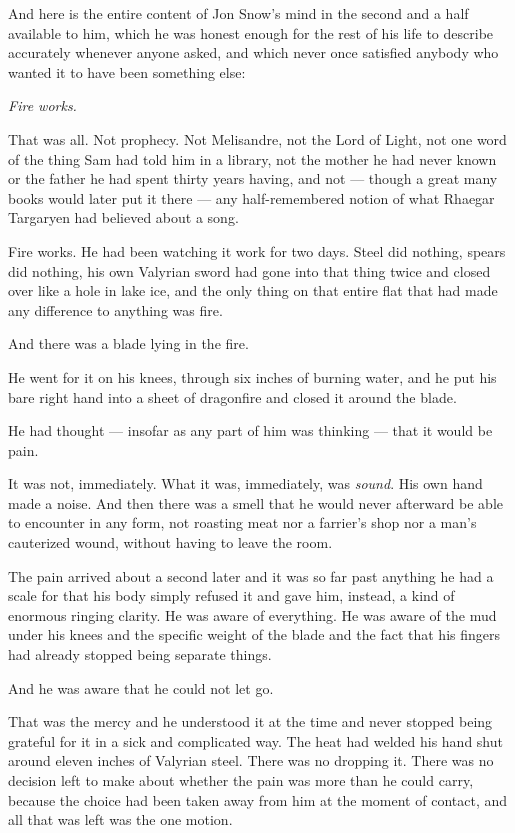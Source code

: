 And here is the entire content of Jon Snow’s mind in the second and a half available to him, which he was honest enough for the rest of his life to describe accurately whenever anyone asked, and which never once satisfied anybody who wanted it to have been something else:

\textit{Fire works.}

That was all. Not prophecy. Not Melisandre, not the Lord of Light, not one word of the thing Sam had told him in a library, not the mother he had never known or the father he had spent thirty years having, and not — though a great many books would later put it there — any half-remembered notion of what Rhaegar Targaryen had believed about a song.

Fire works. He had been watching it work for two days. Steel did nothing, spears did nothing, his own Valyrian sword had gone into that thing twice and closed over like a hole in lake ice, and the only thing on that entire flat that had made any difference to anything was fire.

And there was a blade lying in the fire.

He went for it on his knees, through six inches of burning water, and he put his bare right hand into a sheet of dragonfire and closed it around the blade.

\sceneBreak

He had thought — insofar as any part of him was thinking — that it would be pain.

It was not, immediately. What it was, immediately, was \textit{sound}. His own hand made a noise. And then there was a smell that he would never afterward be able to encounter in any form, not roasting meat nor a farrier’s shop nor a man’s cauterized wound, without having to leave the room.

The pain arrived about a second later and it was so far past anything he had a scale for that his body simply refused it and gave him, instead, a kind of enormous ringing clarity. He was aware of everything. He was aware of the mud under his knees and the specific weight of the blade and the fact that his fingers had already stopped being separate things.

And he was aware that he could not let go.

That was the mercy and he understood it at the time and never stopped being grateful for it in a sick and complicated way. The heat had welded his hand shut around eleven inches of Valyrian steel. There was no dropping it. There was no decision left to make about whether the pain was more than he could carry, because the choice had been taken away from him at the moment of contact, and all that was left was the one motion.


